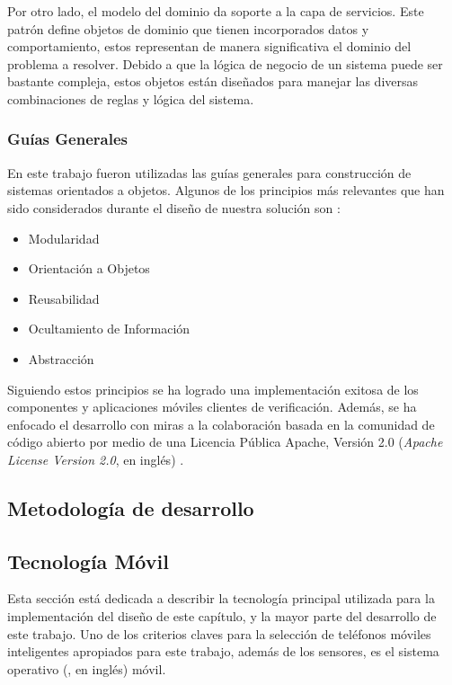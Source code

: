Por otro lado, el modelo del dominio da soporte a la capa de servicios.
Este patrón define objetos de dominio que tienen incorporados datos
y comportamiento, estos representan de manera significativa el dominio
del problema a resolver. Debido a que la lógica de negocio de un sistema
puede ser bastante compleja, estos objetos están diseñados para manejar
las diversas combinaciones de reglas y lógica del sistema.

\subsubsection{Guías Generales}

En este trabajo fueron utilizadas las guías generales para construcción
de sistemas orientados a objetos. Algunos de los principios más relevantes
que han sido considerados durante el diseño de nuestra solución son
\cite{Albin2003}:
\begin{itemize}
\item Modularidad
\item Orientación a Objetos
\item Reusabilidad
\item Ocultamiento de Información
\item Abstracción
\end{itemize}
Siguiendo estos principios se ha logrado una implementación exitosa
de los componentes y aplicaciones móviles clientes de verificación.
Además, se ha enfocado el desarrollo con miras a la colaboración basada
en la comunidad de código abierto por medio de una Licencia Pública
Apache, Versión 2.0 (\emph{Apache License Version 2.0}, en inglés)
\cite{GimenezYegros2016c}.

\subsection{Metodología de desarrollo}

\subsection{Tecnología Móvil}

Esta sección está dedicada a describir la tecnología principal utilizada
para la implementación del diseño de este capítulo, y la mayor parte
del desarrollo de este trabajo. Uno de los criterios claves para la
selección de teléfonos móviles inteligentes apropiados para este trabajo,
además de los sensores, es el sistema operativo (, en inglés)
móvil. 

